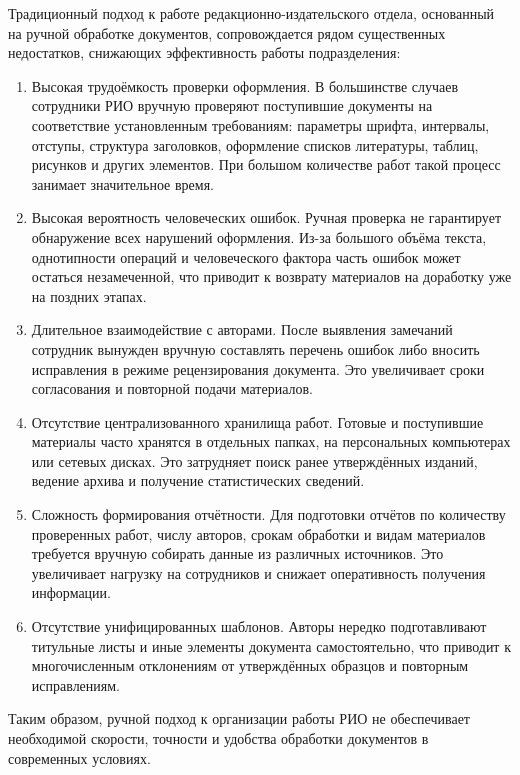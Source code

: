 Традиционный подход к работе редакционно-издательского отдела, основанный на ручной обработке документов, сопровождается рядом существенных недостатков, снижающих эффективность работы подразделения:
\begin{enumerate}
\item{Высокая трудоёмкость проверки оформления.} В большинстве случаев сотрудники РИО вручную проверяют поступившие документы на соответствие установленным требованиям: параметры шрифта, интервалы, отступы, структура заголовков, оформление списков литературы, таблиц, рисунков и других элементов. При большом количестве работ такой процесс занимает значительное время.

\item{Высокая вероятность человеческих ошибок.} Ручная проверка не гарантирует обнаружение всех нарушений оформления. Из-за большого объёма текста, однотипности операций и человеческого фактора часть ошибок может остаться незамеченной, что приводит к возврату материалов на доработку уже на поздних этапах.

\item{Длительное взаимодействие с авторами.} После выявления замечаний сотрудник вынужден вручную составлять перечень ошибок либо вносить исправления в режиме рецензирования документа. Это увеличивает сроки согласования и повторной подачи материалов.

\item{Отсутствие централизованного хранилища работ.} Готовые и поступившие материалы часто хранятся в отдельных папках, на персональных компьютерах или сетевых дисках. Это затрудняет поиск ранее утверждённых изданий, ведение архива и получение статистических сведений.

\item{Сложность формирования отчётности.} Для подготовки отчётов по количеству проверенных работ, числу авторов, срокам обработки и видам материалов требуется вручную собирать данные из различных источников. Это увеличивает нагрузку на сотрудников и снижает оперативность получения информации.

\item{Отсутствие унифицированных шаблонов.} Авторы нередко подготавливают титульные листы и иные элементы документа самостоятельно, что приводит к многочисленным отклонениям от утверждённых образцов и повторным исправлениям.
\end{enumerate}

Таким образом, ручной подход к организации работы РИО не обеспечивает необходимой скорости, точности и удобства обработки документов в современных условиях.

